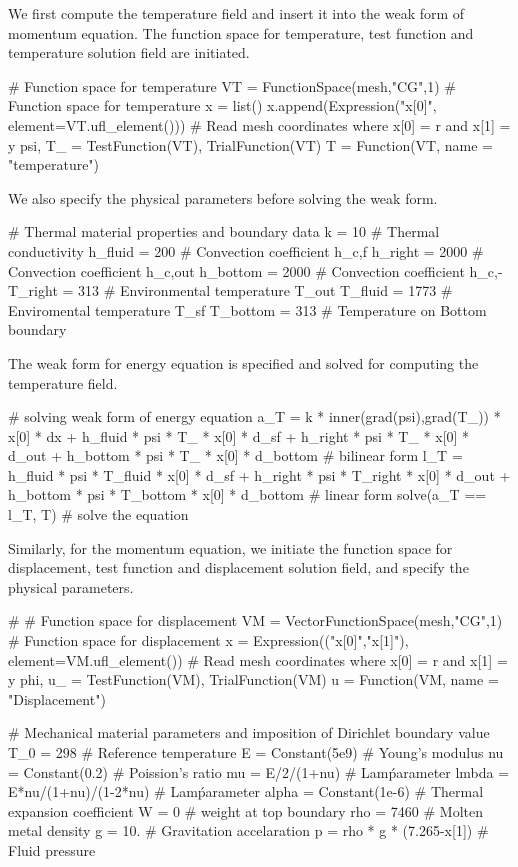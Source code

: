 We first compute the temperature field and insert it into the weak form of momentum equation. The function space for temperature, test function and temperature solution field are initiated.
\begin{python}
# Function space for temperature
VT = FunctionSpace(mesh,"CG",1) # Function space for temperature
x = list()
x.append(Expression("x[0]", element=VT.ufl_element())) # Read mesh coordinates where x[0] = r and x[1] = y
psi, T_ = TestFunction(VT), TrialFunction(VT)
T = Function(VT, name = "temperature")
\end{python}

We also specify the physical parameters before solving the weak form.
\begin{python}
# Thermal material properties and boundary data
k = 10 # Thermal conductivity
h_fluid = 200 # Convection coefficient h_{c,f}
h_right = 2000 # Convection coefficient h_{c,out}
h_bottom = 2000 # Convection coefficient h_{c,-}
T_right = 313 # Environmental temperature T_{out}
T_fluid = 1773 # Enviromental temperature T_{sf}
T_bottom = 313 # Temperature on Bottom boundary
\end{python}

The weak form for energy equation is specified and solved for computing the temperature field.
\begin{python}
# solving weak form of energy equation
a_T = k * inner(grad(psi),grad(T_)) * x[0] * dx + h_fluid * psi * T_ * x[0] * d_sf + h_right * psi * T_ * x[0] * d_out + h_bottom * psi * T_ * x[0] * d_bottom # bilinear form
l_T = h_fluid * psi * T_fluid * x[0] * d_sf + h_right * psi * T_right * x[0] * d_out + h_bottom * psi * T_bottom * x[0] * d_bottom # linear form
solve(a_T == l_T, T) # solve the equation
\end{python}

Similarly, for the momentum equation, we initiate the function space for displacement, test function and displacement solution field, and specify the physical parameters.
\begin{python}
# # Function space for displacement
VM = VectorFunctionSpace(mesh,"CG",1) # Function space for displacement
x = Expression(("x[0]","x[1]"), element=VM.ufl_element()) # Read mesh coordinates where x[0] = r and x[1] = y
phi, u_ = TestFunction(VM), TrialFunction(VM)
u = Function(VM, name = "Displacement")
\end{python}
\begin{python}
# Mechanical material parameters and imposition of Dirichlet boundary value
T_0 = 298 # Reference temperature
E = Constant(5e9) # Young's modulus
nu = Constant(0.2) # Poission's ratio
mu = E/2/(1+nu) # Lam\' parameter
lmbda = E*nu/(1+nu)/(1-2*nu) # Lam\' parameter
alpha = Constant(1e-6) # Thermal expansion coefficient
W = 0 # weight at top boundary
rho = 7460 # Molten metal density
g = 10. # Gravitation accelaration
p = rho * g * (7.265-x[1]) # Fluid pressure
\end{python}

